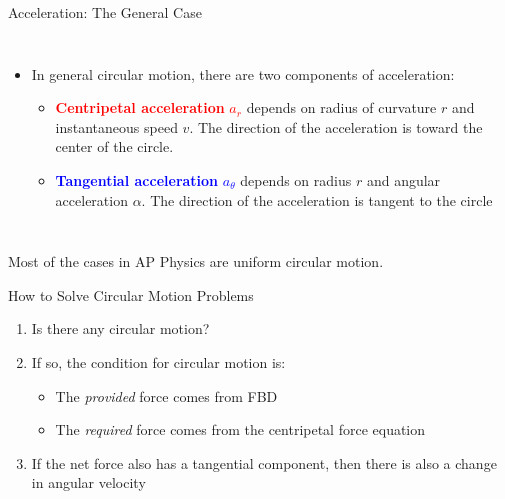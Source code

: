 \documentclass[12pt,compress,aspectratio=169]{beamer}
\newcommand{\mb}[1]{\ensuremath\mathbf{#1}}
\newcommand{\eq}[2]{\vspace{#1}{\Large\begin{displaymath}#2\end{displaymath}}}
\begin{document}
\begin{frame}{Acceleration: The General Case}
  \begin{columns}
    
    \begin{itemize}
    \item In general circular motion, there are two components of acceleration:
      \begin{itemize}
      \item\textcolor{red}{\textbf{Centripetal acceleration} $a_r$} depends on
        radius of curvature $r$ and instantaneous speed $v$. The direction of
        the acceleration is toward the center of the circle.
      \item \textcolor{blue}{\textbf{Tangential acceleration} $a_\theta$}
        depends on radius $r$  and angular acceleration $\alpha$. The direction
        of the acceleration is tangent to the circle
      \end{itemize}
    \end{itemize}
  \end{columns}

  \vspace{.2in}Most of the cases in AP Physics are uniform circular motion.
\end{frame}



\begin{frame}{How to Solve Circular Motion Problems}
  \begin{enumerate}
  \item Is there any circular motion?
  \item If so, the condition for circular motion is:

    \eq{-.2in}{
      \mb{F}_\mathrm{provided}=\mb{F}_\mathrm{required}
    }
    \begin{itemize}
    \item\vspace{-.2in}The \emph{provided} force comes from FBD
    \item The \emph{required} force comes from the centripetal force equation 
    \end{itemize}
  \item If the net force also has a tangential component, then there is also
    a change in angular velocity
  \end{enumerate}
\end{frame}
\end{document}
